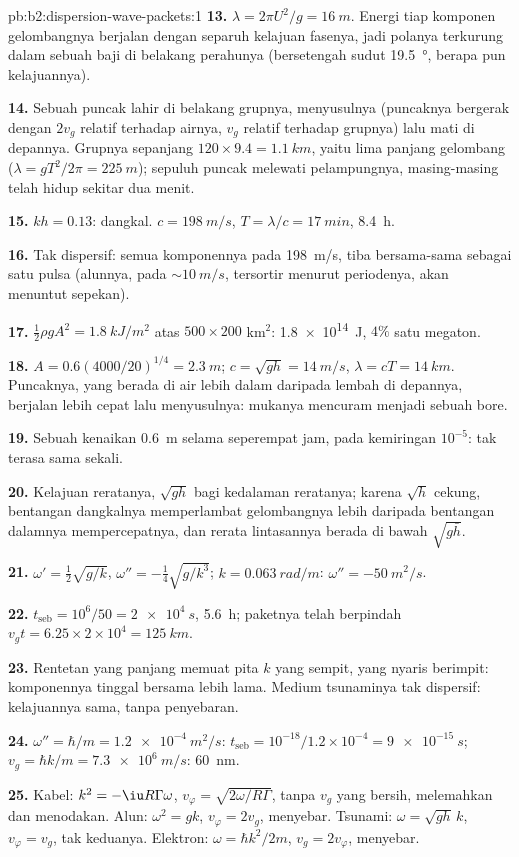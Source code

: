 \begin{solution}{pb:b2:dispersion-wave-packets:1}
\textbf{13.} $\lambda = 2\pi U^2/g = \qty{16}{m}$. Energi tiap komponen gelombangnya
berjalan dengan separuh kelajuan fasenya, jadi polanya terkurung dalam sebuah baji
di belakang perahunya (bersetengah sudut \qty{19.5}{\degree}, berapa pun kelajuannya).

\textbf{14.} Sebuah puncak lahir di belakang grupnya, menyusulnya
(puncaknya bergerak dengan $2v_g$ relatif terhadap airnya, $v_g$ relatif terhadap
grupnya) lalu mati di depannya. Grupnya sepanjang $120 \times 9.4 = \qty{1.1}{km}$,
yaitu lima panjang gelombang ($\lambda = gT^2/2\pi = \qty{225}{m}$); sepuluh puncak melewati
pelampungnya, masing-masing telah hidup sekitar dua menit.

\textbf{15.} $kh = 0.13$: dangkal. $c = \qty{198}{m/s}$, $T = \lambda/c = \qty{17}{min}$,
\qty{8.4}{h}.

\textbf{16.} Tak dispersif: semua komponennya pada \qty{198}{m/s}, tiba
bersama-sama sebagai satu pulsa (alunnya, pada $\sim\qty{10}{m/s}$, tersortir menurut periodenya,
akan menuntut sepekan).

\textbf{17.} $\tfrac12\rho gA^2 = \qty{1.8}{kJ/m^2}$ atas $500 \times 200$ km$^2$: \qty{1.8e14}{J},
$4\%$ satu megaton.

\textbf{18.} $A = 0.6(4000/20)^{1/4} = \qty{2.3}{m}$; $c = \sqrt{gh} = \qty{14}{m/s}$, $\lambda =
cT = \qty{14}{km}$. Puncaknya, yang berada di air lebih dalam daripada lembah di depannya,
berjalan lebih cepat lalu menyusulnya: mukanya mencuram menjadi sebuah bore.

\textbf{19.} Sebuah kenaikan \qty{0.6}{m} selama seperempat jam, pada kemiringan
$10^{-5}$: tak terasa sama sekali.

\textbf{20.} Kelajuan reratanya, $\sqrt{gh}$ bagi kedalaman reratanya; karena
$\sqrt h$ cekung, bentangan dangkalnya memperlambat gelombangnya lebih daripada bentangan
dalamnya mempercepatnya, dan rerata lintasannya berada di bawah $\sqrt{g\bar h}$.

\textbf{21.} $\omega' = \tfrac12\sqrt{g/k}$, $\omega'' = -\tfrac14\sqrt{g/k^3}$; $k = \qty{0.063}{rad/m}$:
$\omega'' = \qty{-50}{m^2/s}$.

\textbf{22.} $t_{\text{seb}} = 10^6/50 = \qty{2e4}{s}$, \qty{5.6}{h}; paketnya telah
berpindah $v_gt = 6.25 \times 2 \times 10^4 = \qty{125}{km}$.

\textbf{23.} Rentetan yang panjang memuat pita $k$ yang sempit, yang  nyaris berimpit: komponennya tinggal bersama lebih lama.
Medium tsunaminya tak dispersif: kelajuannya sama, tanpa penyebaran.

\textbf{24.} $\omega'' = \hbar/m = \qty{1.2e-4}{m^2/s}$: $t_{\text{seb}} = 10^{-18}/1.2 \times
10^{-4} = \qty{9e-15}{s}$; $v_g = \hbar k/m = \qty{7.3e6}{m/s}$: \qty{60}{nm}.

\textbf{25.} Kabel: $k^2 = -\iu R\Gamma\omega$, $v_\varphi = \sqrt{2\omega/R\Gamma}$, tanpa
$v_g$ yang bersih, melemahkan dan menodakan. Alun: $\omega^2 = gk$, $v_\varphi = 2v_g$,
menyebar. Tsunami: $\omega = \sqrt{gh}\,k$, $v_\varphi = v_g$, tak keduanya. Elektron:
$\omega = \hbar k^2/2m$, $v_g = 2v_\varphi$, menyebar.
\end{solution}

